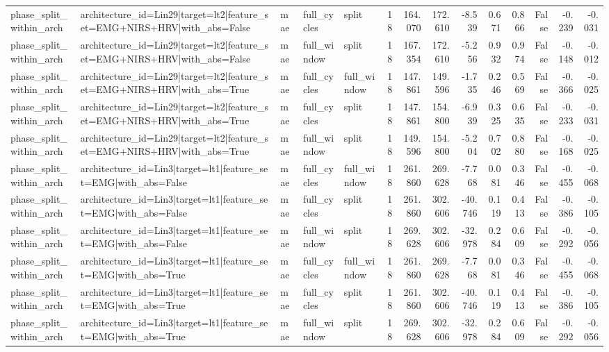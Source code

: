 \begin{table}
\begin{tabular}{lllllrrrrrrrrr}
phase_split_within_arch & architecture_id=Lin29|target=lt2|feature_set=EMG+NIRS+HRV|with_abs=False & mae & full_cycles & split & 18 & 164.070 & 172.610 & -8.539 & 0.671 & 0.866 & False & -0.239 & -0.031 \\
phase_split_within_arch & architecture_id=Lin29|target=lt2|feature_set=EMG+NIRS+HRV|with_abs=False & mae & full_window & split & 18 & 167.354 & 172.610 & -5.256 & 0.932 & 0.974 & False & -0.148 & -0.012 \\
phase_split_within_arch & architecture_id=Lin29|target=lt2|feature_set=EMG+NIRS+HRV|with_abs=True & mae & full_cycles & full_window & 18 & 147.861 & 149.596 & -1.735 & 0.246 & 0.569 & False & -0.366 & -0.025 \\
phase_split_within_arch & architecture_id=Lin29|target=lt2|feature_set=EMG+NIRS+HRV|with_abs=True & mae & full_cycles & split & 18 & 147.861 & 154.800 & -6.939 & 0.325 & 0.635 & False & -0.233 & -0.031 \\
phase_split_within_arch & architecture_id=Lin29|target=lt2|feature_set=EMG+NIRS+HRV|with_abs=True & mae & full_window & split & 18 & 149.596 & 154.800 & -5.204 & 0.702 & 0.880 & False & -0.168 & -0.025 \\
phase_split_within_arch & architecture_id=Lin3|target=lt1|feature_set=EMG|with_abs=False & mae & full_cycles & full_window & 18 & 261.860 & 269.628 & -7.768 & 0.081 & 0.346 & False & -0.455 & -0.068 \\
phase_split_within_arch & architecture_id=Lin3|target=lt1|feature_set=EMG|with_abs=False & mae & full_cycles & split & 18 & 261.860 & 302.606 & -40.746 & 0.119 & 0.413 & False & -0.386 & -0.105 \\
phase_split_within_arch & architecture_id=Lin3|target=lt1|feature_set=EMG|with_abs=False & mae & full_window & split & 18 & 269.628 & 302.606 & -32.978 & 0.284 & 0.609 & False & -0.292 & -0.056 \\
phase_split_within_arch & architecture_id=Lin3|target=lt1|feature_set=EMG|with_abs=True & mae & full_cycles & full_window & 18 & 261.860 & 269.628 & -7.768 & 0.081 & 0.346 & False & -0.455 & -0.068 \\
phase_split_within_arch & architecture_id=Lin3|target=lt1|feature_set=EMG|with_abs=True & mae & full_cycles & split & 18 & 261.860 & 302.606 & -40.746 & 0.119 & 0.413 & False & -0.386 & -0.105 \\
phase_split_within_arch & architecture_id=Lin3|target=lt1|feature_set=EMG|with_abs=True & mae & full_window & split & 18 & 269.628 & 302.606 & -32.978 & 0.284 & 0.609 & False & -0.292 & -0.056 \\

\end{tabular}
\end{table}
